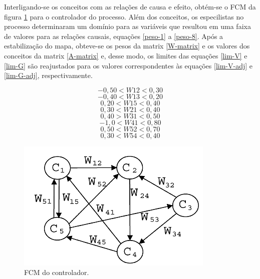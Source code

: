 Interligando-se os conceitos com as relações de causa e efeito, obtém-se o FCM da figura \ref{fig:fcm-exemplo-fcm} para o controlador do processo. Além dos conceitos, os especilistas no processo determinaram um domínio para as variáveis que resultou em uma faixa de valores para as relações causais, equações \ref{peso-1} a \ref{peso-8}. Após a estabilização do mapa, obteve-se os pesos da matrix \ref{W-matrix} e os valores dos conceitos da matrix \ref{A-matrix} e, desse modo, os limites das equações \ref{lim-V} e \ref{lim-G} são reajustados para os valores correspondentes às equações \ref{lim-V-adj} e \ref{lim-G-adj}, respectivamente.

\begin{equation}\label{peso-1}
-0,50<W12<0,30
\end{equation}
\begin{equation}\label{peso-2}
-0,40<W13<0,20
\end{equation}
\begin{equation}\label{peso-3}
0,20<W15<0,40
\end{equation}
\begin{equation}\label{peso-4}
0,30<W21<0,40
\end{equation}
\begin{equation}\label{peso-5}
0,40>W31<0,50
\end{equation}
\begin{equation}\label{peso-6}
-1,0<W41<0,80
\end{equation}
\begin{equation}\label{peso-7}
0,50<W52<0,70
\end{equation}
\begin{equation}\label{peso-8}
0,30<W54<0,40
\end{equation}

\begin{figure}[!htb]
    \centering
    \includegraphics{./figs/fcm-exemplo-fcm.png}
    \caption[Mapa Cognitivo Fuzzy]{FCM do controlador.}
    \label{fig:fcm-exemplo-fcm}
\end{figure}

